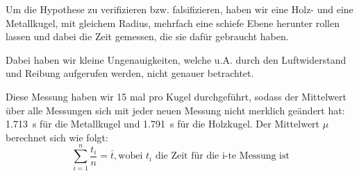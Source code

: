 \documentclass[11pt,a4paper,titlepage, ngerman]{article}
\begin{document}
				Um die Hypothese zu verifizieren bzw. falsifizieren, haben wir eine Holz- und eine Metallkugel, mit gleichem Radius, mehrfach eine schiefe Ebene herunter rollen lassen und dabei die Zeit gemessen, die sie dafür gebraucht haben.
				
				Dabei haben wir kleine Ungenauigkeiten, welche u.A. durch den Luftwiderstand und Reibung aufgerufen werden, nicht genauer betrachtet. 
				
				Diese Messung haben wir 15 mal pro Kugel durchgeführt, sodass der Mittelwert über alle Messungen sich mit jeder neuen Messung nicht merklich geändert hat: \SI{1.713}{\s} für die Metallkugel und \SI{1.791}{\s} für die Holzkugel. Der Mittelwert $\mu$ berechnet sich wie folgt:
				\begin{equation*}
					 \sum\limits_{i=1}^n \frac{t_i}{n} = \bar{t}, \text{wobei $t_i$ die Zeit für die i-te Messung ist}
				\end{equation*}		
				
\end{document}
